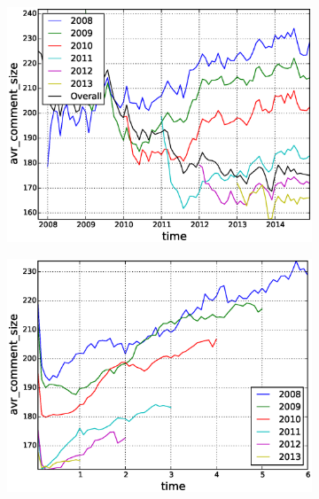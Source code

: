 \begin{figure}[!tb]
\centering
\begin{subfigure}{.49\textwidth}\includegraphics[scale=0.4]{./images/avr_comment_size_over_time_cohorts.eps}\caption{}\end{subfigure}
\begin{subfigure}{.49\textwidth}\includegraphics[scale=0.4]{./images/avr_comment_size_cohorts.eps}\caption{}\end{subfigure}

\end{figure}
